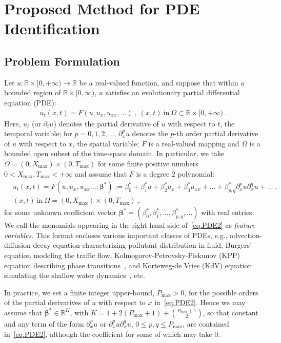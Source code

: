 \documentclass[a4paper,11pt]{article}
\newcommand{\bbeta}{\bm{\beta}}
\begin{document}
\section{Proposed Method for PDE Identification}
\subsection{Problem Formulation}
Let $u:\mathbb{R}\times[0,+\infty)\to\mathbb{R}$ be a real-valued function, and suppose that within a bounded region of $\mathbb{R}\times[0,\infty)$, $u$ satisfies an evolutionary partial differential equation (PDE):
\begin{align}
u_t(x,t) = F(u,u_x,u_{xx},\dots)	\;,~(x,t)~\text{in}~\Omega\subset\mathbb{R}\times[0,+\infty)\;.\label{eq.PDE}
\end{align}
Here, $u_t$ (or $\partial_tu$) denotes the partial derivative of $u$ with respect to $t$, the temporal variable; for $p=0,1,2,\dots$, $\partial^{p}_xu$ denotes the $p$-th order partial derivative of $u$ with respect to $x$, the spatial variable; $F$ is a real-valued mapping and $\Omega$ is a bounded open subset of the time-space domain. In particular, we take $\Omega=(0,X_{\max})\times(0,T_{\max})$ for some finite positive numbers $0<X_{\max}, T_{\max}<+\infty$ and assume that $F$ is a degree $2$ polynomial:
\begin{align}
&u_t(x,t) = F(u,u_x,u_{xx}\dots;\bbeta^*):=\beta^*_0+\beta^*_1u+\beta^*_2u_x+\beta^*_3u_{xx}+\dots+\beta^*_{p,q}\partial^p_xu\partial^q_xu+\dots	\;,\nonumber\\
&(x,t)~\text{in}~\Omega = (0,X_{\max})\times(0,T_{\max})\;,\label{eq.PDE2}
\end{align}
for some  unknown coefficient vector $\bbeta^*=(\beta^*_0,\beta^*_1,\dots,\beta^*_{p,q},\dots)$ with real entries. We call the monomials appearing in the right hand side of~\eqref{eq.PDE2} as \textit{feature variables}. This format encloses various important classes of PDEs, e.g., advection-diffusion-decay equation characterizing pollutant distribution in fluid, Burgers' equation modeling the traffic flow, Kolmogorov-Petrovsky-Piskunov (KPP) equation describing phase transitions~\cite{tikhomirov1991study}, and Korteweg-de Vries (KdV) equation simulating the shallow water dynamics~\cite{newell1985solitons}, etc. 

In practice, we set a finite integer upper-bound, $P_{\max}>0$, for the possible orders of the partial derivatives of $u$ with respect to $x$ in~\eqref{eq.PDE2}. Hence we may assume that $\bbeta^*\in\mathbb{R}^{K}$, with $K=1+2(P_{\max}+1)+{{P_{\max}+1}\choose{2}}$, so that constant and any term of the form $\partial_x^pu$ or $\partial^p_xu\partial_x^qu$, $0\leq p,q\leq P_{\max}$, are contained  in~\eqref{eq.PDE2}, although the coefficient for some of which may take $0$.
\end{document}
